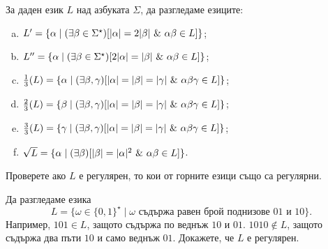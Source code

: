 \begin{problem}
  За даден език $L$ над азбуката $\Sigma$, да разгледаме езиците:
  \begin{enumerate}[a)]
  \item
    $L' = \{\alpha \mid (\exists \beta\in\Sigma^\star)[\lvert{\alpha}\rvert = 2\lvert{\beta}\rvert\ \&\ \alpha\beta \in L]\}$;
  \item 
    $L'' = \{\alpha \mid (\exists \beta\in\Sigma^\star)[2\lvert{\alpha}\rvert = \lvert{\beta}\rvert\ \&\ \alpha\beta \in L]\}$;
  \item 
    $\frac{1}{3}(L) = \{\alpha \mid (\exists \beta,\gamma)[\abs{\alpha} = \abs{\beta} = \abs{\gamma}\ \&\ \alpha\beta\gamma \in L]\}$;
  \item
    $\frac{2}{3}(L) = \{\beta \mid (\exists \beta,\gamma)[\abs{\alpha} = \abs{\beta} = \abs{\gamma}\ \&\ \alpha\beta\gamma \in L]\}$;
  \item
    $\frac{3}{3}(L) = \{\gamma \mid (\exists \beta,\gamma)[\abs{\alpha} = \abs{\beta} = \abs{\gamma}\ \&\ \alpha\beta\gamma \in L]\}$;
  \item
    $\sqrt{L} = \{\alpha \mid (\exists \beta)[\lvert{\beta}\rvert = \lvert{\alpha}\rvert^2\ \&\ \alpha\beta \in L]\}$.
  \end{enumerate}
  Проверете ако $L$ е регулярен, то кои от горните езици също са регулярни.
\end{problem}


\begin{problem}
  Да разгледаме езика
  \[L = \{\omega \in \{0,1\}^\star \mid \omega\text{ съдържа равен брой поднизове }01\text{ и }10\}.\]
  Например, $101 \in L$, защото съдържа по веднъж $10$ и $01$.
  $1010 \not\in  L$, защото съдържа два пъти $10$ и само веднъж $01$.
  Докажете, че $L$ е регулярен.
\end{problem}


